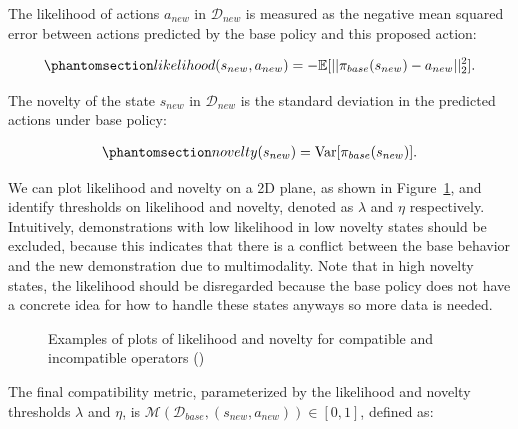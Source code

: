 \documentclass[
  letterpaper,
  numbers=noenddot,
  DIV=11]{scrreprt}
\theoremstyle{plain}
\theoremstyle{definition}
\theoremstyle{plain}
\theoremstyle{remark}
\begin{document}
The likelihood of actions \(a_{new}\) in \(\mathcal{D}_{new}\) is
measured as the negative mean squared error between actions predicted by
the base policy and this proposed action:

\begin{equation}\phantomsection\label{eq-eq3.61}{\begin{aligned}
    likelihood(s_{new}, a_{new}) = -\mathbb{E}[|| \pi_{base}(s_{new}) - a_{new} ||^2_2].
\end{aligned}}\end{equation}

The novelty of the state \(s_{new}\) in \(\mathcal{D}_{new}\) is the
standard deviation in the predicted actions under base policy:

\begin{equation}\phantomsection\label{eq-eq3.62}{\begin{aligned}
    novelty(s_{new}) = \mathrm{Var}[\pi_{base}(s_{new})].
\end{aligned}}\end{equation}

We can plot likelihood and novelty on a 2D plane, as shown in
Figure~\ref{fig-likelihood_novelty}, and identify thresholds on
likelihood and novelty, denoted as \(\lambda\) and \(\eta\)
respectively. Intuitively, demonstrations with low likelihood in low
novelty states should be excluded, because this indicates that there is
a conflict between the base behavior and the new demonstration due to
multimodality. Note that in high novelty states, the likelihood should
be disregarded because the base policy does not have a concrete idea for
how to handle these states anyways so more data is needed.

\begin{figure}


\caption{\label{fig-likelihood_novelty}Examples of plots of likelihood
and novelty for compatible and incompatible operators
()}

\end{figure}%

The final compatibility metric, parameterized by the likelihood and
novelty thresholds \(\lambda\) and \(\eta\), is
\(\mathcal{M}(\mathcal{D}_{base}, (s_{new}, a_{new})) \in [0, 1]\),
defined as:
\end{document}
